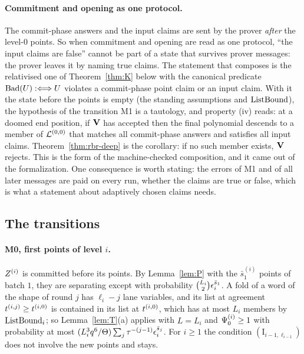 \paragraph{Commitment and opening as one protocol.} The commit-phase answers and the input claims are sent by the prover \emph{after} the level-$0$ points. So when commitment and opening are read as one protocol, ``the input claims are false'' cannot be part of a state that survives prover messages: the prover leaves it by naming true claims. The statement that composes is the relativised one of Theorem~\ref{thm:K} below with the canonical predicate $\mathrm{Bad}(U):\Longleftrightarrow U$ violates a commit-phase point claim or an input claim. With it the state before the points is empty (the standing assumptions and $\mathrm{ListBound}$), the hypothesis of the transition M1 is a tautology, and property (iv) reads: at a doomed end position, if $\mathbf{V}$ has accepted then the final polynomial descends to a member of $\mathcal{L}^{(0,0)}$ that matches all commit-phase answers and satisfies all input claims. Theorem~\ref{thm:rbr-deep} is the corollary: if no such member exists, $\mathbf{V}$ rejects. This is the form of the machine-checked composition, and it came out of the formalization. One consequence is worth stating: the errors of M1 and of all later messages are paid on every run, whether the claims are true or false, which is what a statement about adaptively chosen claims needs.

\subsection{The transitions}\label{sec:transitions}

\paragraph{M0, first points of level $i$.} $Z^{(i)}$ is committed before its points. By Lemma~\ref{lem:P} with the $\bar s^{(i)}_1$ points of batch $1$, they are separating except with probability $\binom{L_i}{2}\epsilon_i^{\bar s_1}$. A fold of a word of the shape of round $j$ has $\ell_i-j$ lane variables, and its list at agreement $t^{(i,j)}\ge t^{(i,0)}$ is contained in its list at $t^{(i,0)}$, which has at most $L_i$ members by $\mathrm{ListBound}_i$; so Lemma~\ref{lem:T}(a) applies with $L=L_i$ and $\Psi^{(i)}_0\ge1$ with probability at most $(L_i^3q^6/\Theta)\sum_j\tau^{-(j-1)}\epsilon_i^{\bar s_j}$. For $i\ge1$ the condition $(\mathrm I_{i-1,\ell_{i-1}})$ does not involve the new points and stays.

